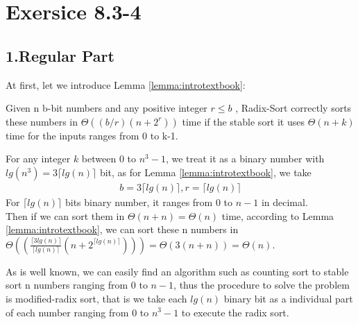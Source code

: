 \documentclass[oneside]{homework} %
\begin{document}
\maketitle
\newpage

\section*{Exersice 8.3-4}

\subsection* {1.Regular Part}
At first, let we introduce Lemma \ref{lemma:introtextbook}:\\
\begin{lemma}
  Given n b-bit numbers and any positive integer 
  \begin{math}
	r\leq b
  \end{math}
  , Radix-Sort correctly sorts these numbers in 
  \begin{math}
	\Theta((b/r)(n+2^{r}))
  \end{math}
  time if the stable sort it uses 
  \begin{math}
	\Theta(n+k) 
  \end{math}
  time for the inputs ranges from 0 to k-1.
  \label{lemma:introtextbook}
\end{lemma}

For any integer $k$ between 0 to $n^{3}-1$, we treat it as a binary number with $lg(n^{3}) = 3\lceil lg(n) \rceil$ bit, as for Lemma \ref{lemma:introtextbook}, we take 
\begin{equation}
  \begin{split}
	b = 3\lceil lg(n) \rceil , 
	r = \lceil lg(n) \rceil
  \end{split}
  \label{equ:denoting1}
\end{equation}
For $\lceil lg(n) \rceil$ bits binary number, it ranges from 0 to $n-1$ in decimal. \\
Then if we can sort them in $\Theta(n+n) = \Theta(n)$ time,
according to Lemma \ref{lemma:introtextbook}, we can sort these n numbers in $\Theta((\frac{\lceil 3lg(n) \rceil}{\lceil lg(n) \rceil}(n+2^{\lceil lg(n) \rceil}))) = \Theta (3(n+n)) = \Theta(n)$.

As is well known, we can easily find an algorithm such as counting sort to stable sort n numbers ranging from 0 to  $n-1$, thus the procedure to solve the problem is modified-radix sort, that is we take each $lg(n)$ binary bit as a individual part of each number ranging from 0 to $n^{3}-1$ to execute the radix sort.
\end{document}
